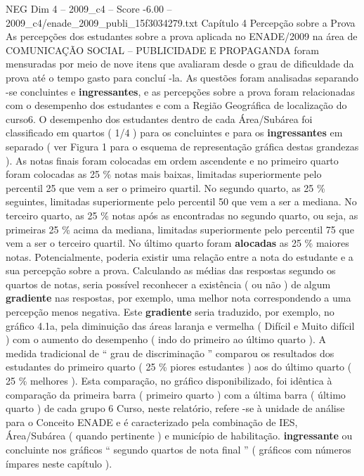 \begin{textsample}{NEG Dim 4 – 2009\_c4 – Score -6.00 – 2009\_c4/enade\_2009\_publi\_15f3034279.txt}  \label{ex:f4_neg_026}
Capítulo 4 Percepção sobre a Prova As percepções dos estudantes sobre a prova aplicada no ENADE/2009 na área de COMUNICAÇÃO SOCIAL – PUBLICIDADE E PROPAGANDA foram mensuradas por meio de nove itens que avaliaram desde o grau de dificuldade da prova até o tempo gasto para concluí -la.
As questões foram analisadas separando -se concluintes e \textbf{ingressantes}, e as percepções sobre a prova foram relacionadas com o desempenho dos estudantes e com a Região Geográfica de localização do curso6.
O desempenho dos estudantes dentro de cada Área/Subárea foi classificado em quartos ( 1/4 ) para os concluintes e para os \textbf{ingressantes} em separado ( ver Figura 1 para o esquema de representação gráfica destas grandezas ).
As notas finais foram colocadas em ordem ascendente e no primeiro quarto foram colocadas as 25 \% notas mais baixas, limitadas superiormente pelo percentil 25 que vem a ser o primeiro quartil.
No segundo quarto, as 25 \% seguintes, limitadas superiormente pelo percentil 50 que vem a ser a mediana.
No terceiro quarto, as 25 \% notas após as encontradas no segundo quarto, ou seja, as primeiras 25 \% acima da mediana, limitadas superiormente pelo percentil 75 que vem a ser o terceiro quartil.
No último quarto foram \textbf{alocadas} as 25 \% maiores notas.
Potencialmente, poderia existir uma relação entre a nota do estudante e a sua percepção sobre a prova.
Calculando as médias das respostas segundo os quartos de notas, seria possível reconhecer a existência ( ou não ) de algum \textbf{gradiente} nas respostas, por exemplo, uma melhor nota correspondendo a uma percepção menos negativa.
Este \textbf{gradiente} seria traduzido, por exemplo, no gráfico 4.1a, pela diminuição das áreas laranja e vermelha ( Difícil e Muito difícil ) com o aumento do desempenho ( indo do primeiro ao último quarto ).
A medida tradicional de “ grau de discriminação ” comparou os resultados dos estudantes do primeiro quarto ( 25 \% piores estudantes ) aos do último quarto ( 25 \% melhores ).
Esta comparação, no gráfico disponibilizado, foi idêntica à comparação da primeira barra ( primeiro quarto ) com a última barra ( último quarto ) de cada grupo 6 Curso, neste relatório, refere -se à unidade de análise para o Conceito ENADE e é caracterizado pela combinação de IES, Área/Subárea ( quando pertinente ) e município de habilitação. \textbf{ingressante} ou concluinte nos gráficos “ segundo quartos de nota final ” ( gráficos com números ímpares neste capítulo ).

\end{textsample}

